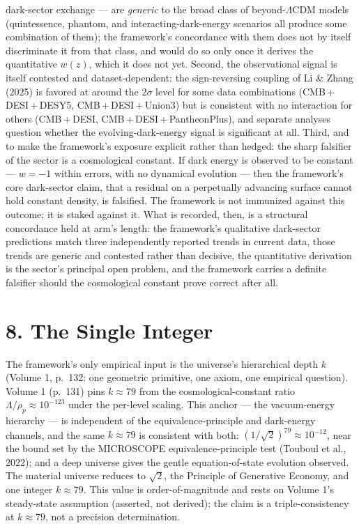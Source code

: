 \documentclass[11pt,oneside]{report}
\theoremstyle{definition}
\theoremstyle{remark}
\begin{document}
dark-sector exchange --- are \emph{generic} to the broad class of beyond-$\Lambda$CDM
models (quintessence, phantom, and interacting-dark-energy scenarios all produce
some combination of them); the framework's concordance with them does not by itself
discriminate it from that class, and would do so only once it derives the
quantitative $w(z)$, which it does not yet. Second, the observational signal is
itself contested and dataset-dependent: the sign-reversing coupling of Li \& Zhang
(2025) is favored at around the $2\sigma$ level for some data combinations
(CMB\,+\,DESI\,+\,DESY5, CMB\,+\,DESI\,+\,Union3) but is consistent with no
interaction for others (CMB\,+\,DESI, CMB\,+\,DESI\,+\,PantheonPlus), and separate
analyses question whether the evolving-dark-energy signal is significant at all.
Third, and to make the framework's exposure explicit rather than hedged: the
sharp falsifier of the sector is a cosmological constant. If dark energy is
observed to be constant --- $w = -1$ within errors, with no dynamical evolution ---
then the framework's core dark-sector claim, that a residual on a perpetually
advancing surface cannot hold constant density, is falsified. The framework is not
immunized against this outcome; it is staked against it. What is recorded, then, is
a structural concordance held at arm's length: the framework's qualitative
dark-sector predictions match three independently reported trends in current data,
those trends are generic and contested rather than decisive, the quantitative
derivation is the sector's principal open problem, and the framework carries a
definite falsifier should the cosmological constant prove correct after all.

\section*{8. The Single Integer}

The framework's only empirical input is the universe's hierarchical depth
\ensuremath{k} (Volume 1, p.~132: one geometric primitive, one axiom, one
empirical question). Volume 1 (p.~131) pins \ensuremath{k \approx 79} from
the cosmological-constant ratio \ensuremath{\Lambda/\rho_p \approx
10^{-123}} under the per-level scaling. This anchor --- the vacuum-energy
hierarchy --- is independent of the equivalence-principle and dark-energy
channels, and the same \ensuremath{k \approx 79} is consistent with both:
\ensuremath{(1/\sqrt{2})^{79} \approx 10^{-12}}, near the bound set by
the MICROSCOPE equivalence-principle test (Touboul et al., 2022); and a deep universe gives the gentle equation-of-state evolution
observed. The material universe reduces to \ensuremath{\sqrt{2}}, the
Principle of Generative Economy, and one integer \ensuremath{k \approx
79}. This value is order-of-magnitude and rests on Volume 1's
steady-state assumption (asserted, not derived); the claim is a
triple-consistency at \ensuremath{k \approx 79}, not a precision
determination.
\end{document}

